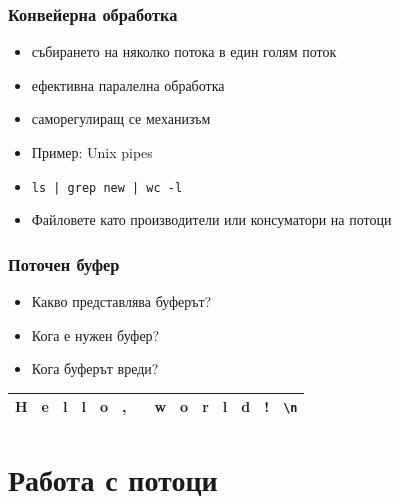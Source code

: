 \documentclass{beamer}
\begin{document}
\begin{frame}
  \frametitle{Конвейерна обработка}

  \begin{itemize}
  \item събирането на няколко потока в един голям поток
  \item ефективна паралелна обработка
  \item саморегулиращ се механизъм
  \item Пример: Unix pipes
  \item \tt{ls | grep new | wc -l}
  \item Файловете като производители или консуматори на потоци
  \end{itemize}
\end{frame}

\begin{frame}
  \frametitle{Поточен буфер}

  \begin{itemize}
  \item Какво представлява буферът?
  \item Кога е нужен буфер?
  \item Кога буферът вреди?
  \end{itemize}
  \vspace{2em}

  \begin{tabular}{|c|c|c|c|c|c|c|c|c|c|c|c|c|c|}
    \rowcolor{diagramblue}
    \hline
    H&e&l&l&o&,& &w&o&r&l&d&!&\tt{\textbackslash n}\\
    \hline
  \end{tabular}
\end{frame}

\section{Работа с потоци}
\end{document}
